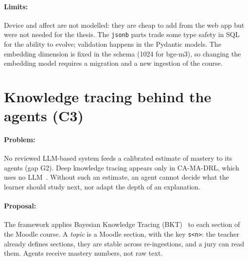 \paragraph{Limits:} Device and affect are not modelled: they are cheap to
add from the web app but were not needed for the thesis. The
\texttt{jsonb} parts trade some type safety in SQL for the ability to
evolve; validation happens in the Pydantic models. The embedding
dimension is fixed in the schema (1024 for bge-m3), so changing the
embedding model requires a migration and a new ingestion of the course.

\section[Knowledge tracing behind the agents]{Knowledge tracing behind the agents (C3)}
\label{sec-c3}

\paragraph{Problem:} No reviewed LLM-based system feeds a calibrated
estimate of mastery to its agents (gap G2). Deep knowledge tracing
appears only in CA-MA-DRL, which uses no LLM~\cite{sharif2026camadrl}.
Without such an estimate, an agent cannot decide what the learner should
study next, nor adapt the depth of an explanation.

\paragraph{Proposal:} The framework applies Bayesian Knowledge Tracing
(BKT)~\cite{corbett1994kt} to each section of the Moodle course. A
\emph{topic} is a Moodle section, with the key \texttt{s<n>}: the teacher
already defines sections, they are stable across re-ingestions, and a jury
can read them. Agents receive mastery numbers, not raw text.

